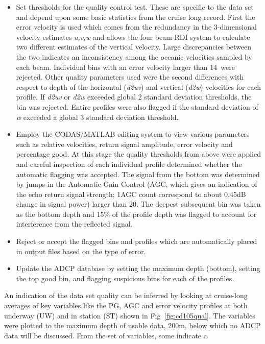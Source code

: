 \begin{itemize}
  \item Set thresholds for the quality control test. These are
  specific to the data set and depend upon some basic statistics
  from the cruise long record. First the error velocity is used
  which comes from the redundancy in the 3-dimensional velocity
  estimates \emph{u,v,w} and allows the four beam RDI system to calculate two
  different estimates of the vertical velocity. Large
  discrepancies between the two indicates an inconsistency among
  the oceanic velocities sampled by each beam. Individual bins
  with an error velocity larger than 14\velc\, were rejected. Other
  quality parameters used were the second differences with respect to
  depth of the horizontal (\emph{d2uv}) and vertical (\emph{d2w}) velocities
  for each profile. If \emph{d2uv} or \emph{d2w} exceeded
  global 2 standard deviation thresholds, the bin was rejected.
  Entire profiles were also flagged if the standard deviation of
  \emph{w} exceeded a global 3 standard deviation threshold.
  \item Employ the CODAS/MATLAB editing system to view various
parameters such as relative velocities, return signal amplitude,
error velocity and percentage good. At this stage the quality
thresholds from above were applied and careful inspection of each
individual profile determined whether the automatic flagging was
accepted. The signal from the bottom was determined by jumps in
the Automatic Gain Control (AGC, which gives an indication of the
echo return signal strength; 1AGC count correspond to about 0.45dB
change in signal power) larger than 20. The deepest subsequent bin
was taken as the bottom depth and 15\% of the profile depth was
flagged to account for interference from the reflected signal.
\item Reject or accept the flagged bins and profiles which are
automatically placed in output files based on the type of error.
\item Update the ADCP database by setting the maximum depth
(bottom), setting  the top good bin, and flagging suspicious bins
for each of the profiles.
\end{itemize}
An indication of the data set quality can be inferred by looking
at cruise-long averages of key variables like the PG, AGC and
error velocity profiles at both underway (UW) and in station (ST)
shown in Fig~\ref{fig:cd105qual}. The variables were plotted to
the maximum depth of usable data, 200m, below which no ADCP data
will be discussed. From the set of variables, some indicate a
